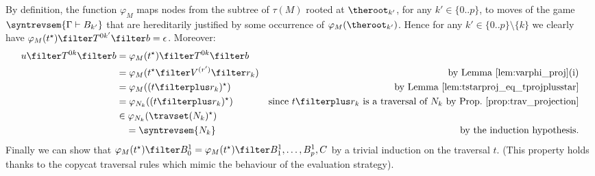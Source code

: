 \begin{itemize}[$\bullet$]
{\begin{enumerate}
    By definition, the function $\varphi_{M}$ maps nodes from the subtree of $\tau(M)$ rooted at $\theroot_{k'}$, for any $k'\in \{0..p\}$, to moves of the game $\syntrevsem{\Gamma \vdash B_{k'}}$ that are hereditarily justified by some occurrence of $\varphi_M(\theroot_{k'})$.
    Hence for any $k'\in \{0..p\}\setminus\{k\}$ we clearly have $\varphi_{M}(t^\star) \filter T^{0k'} \filter b = \epsilon$.
    Moreover:
    \begin{align*}
        u \filter T^{0k}\filter b &= \varphi_{M}(t^\star) \filter T^{0k}\filter b \\
         &= \varphi_{M}(t^\star \filter V^{(r')} \filter r_k ) & \mbox{by Lemma \ref{lem:varphi_proj}(i)} \\
         &= \varphi_{M}((t\filterplus r_k)^\star) & \mbox{by Lemma \ref{lem:tstarproj_eq_tprojplusstar}} \\
         &= \varphi_{N_k}((t\filterplus r_k)^\star) & \mbox{since $t\filterplus r_k$ is a traversal of $N_k$ by Prop.\ \ref{prop:trav_projection}} \\
         &\in \varphi_{N_k}(\travset(N_k)^\star) \\
         &\quad = \syntrevsem{N_k} & \mbox{by the induction hypothesis.}
    \end{align*}
    Finally we can show that $\varphi_{M}(t^\star) \filter B^1_0 = \varphi_{M}(t^\star) \filter B^1_1, \ldots, B^1_p, C$ by a trivial induction on the traversal $t$. (This property holds thanks to the copycat traversal rules which mimic the behaviour of the evaluation strategy).
\end{enumerate}
    
    
    
    
    
    
    
    }

\end{itemize}



